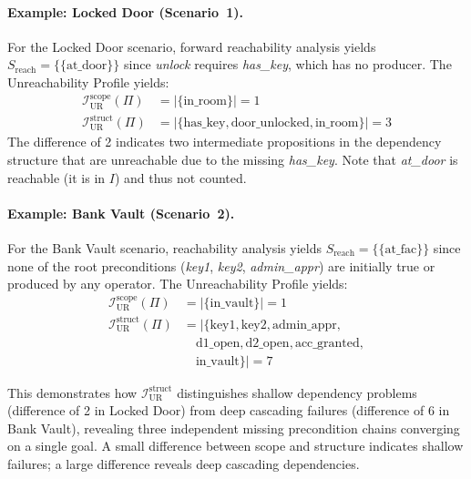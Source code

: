 \paragraph{Example: Locked Door (Scenario~1).} For the Locked Door scenario, forward reachability analysis yields $S_{\text{reach}} = \{\{\text{at\_door}\}\}$ since \textit{unlock} requires \textit{has\_key}, which has no producer. The Unreachability Profile yields:
\begin{align*}
    \mathcal{I}^{\text{scope}}_{\text{UR}}(\Pi)  & = |\{\text{in\_room}\}| = 1                                         \\
    \mathcal{I}^{\text{struct}}_{\text{UR}}(\Pi) & = |\{\text{has\_key}, \text{door\_unlocked}, \text{in\_room}\}| = 3
\end{align*}
The difference of 2 indicates two intermediate propositions in the dependency structure that are unreachable due to the missing \textit{has\_key}. Note that \textit{at\_door} is reachable (it is in $I$) and thus not counted.

\paragraph{Example: Bank Vault (Scenario~2).} For the Bank Vault scenario, reachability analysis yields $S_{\text{reach}} = \{\{\text{at\_fac}\}\}$ since none of the root preconditions (\textit{key1}, \textit{key2}, \textit{admin\_appr}) are initially true or produced by any operator. The Unreachability Profile yields:
\begin{align*}
    \mathcal{I}^{\text{scope}}_{\text{UR}}(\Pi)  & = |\{\text{in\_vault}\}| = 1                                 \\
    \mathcal{I}^{\text{struct}}_{\text{UR}}(\Pi) & = |\{\text{key1}, \text{key2}, \text{admin\_appr},           \\
                                                 & \quad \text{d1\_open}, \text{d2\_open}, \text{acc\_granted}, \\
                                                 & \quad \text{in\_vault}\}| = 7
\end{align*}

This demonstrates how $\mathcal{I}^{\text{struct}}_{\text{UR}}$ distinguishes shallow dependency problems (difference of 2 in Locked Door) from deep cascading failures (difference of 6 in Bank Vault), revealing three independent missing precondition chains converging on a single goal. A small difference between scope and structure indicates shallow failures; a large difference reveals deep cascading dependencies.

